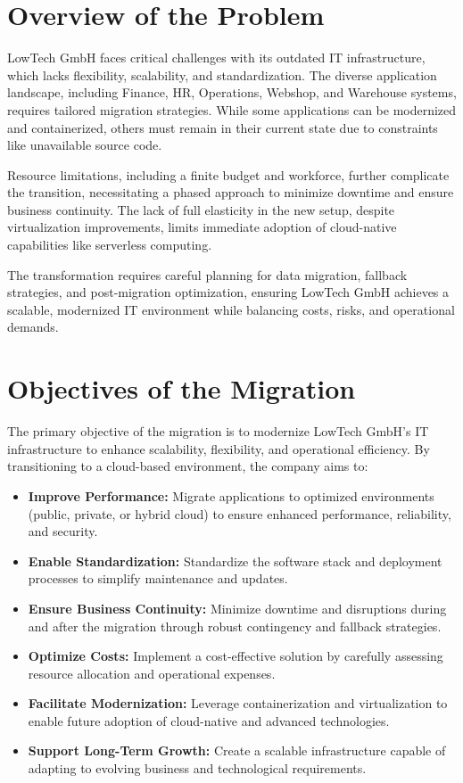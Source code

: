 \documentclass{llncs}
\begin{document}
\section{Overview of the Problem}
LowTech GmbH faces critical challenges with its outdated IT infrastructure, which lacks flexibility, scalability, and standardization. 
The diverse application landscape, including Finance, HR, Operations, Webshop, and Warehouse systems, 
requires tailored migration strategies. While some applications can be modernized and containerized, 
others must remain in their current state due to constraints like unavailable source code. 

Resource limitations, including a finite budget and workforce, further complicate the transition, necessitating 
a phased approach to minimize downtime and ensure business continuity. 
The lack of full elasticity in the new setup, despite virtualization improvements, limits immediate adoption 
of cloud-native capabilities like serverless computing. 

The transformation requires careful planning for data migration, fallback strategies, 
and post-migration optimization, ensuring LowTech GmbH achieves a scalable, 
modernized IT environment while balancing costs, risks, and operational demands.


\section{Objectives of the Migration}

The primary objective of the migration is to modernize LowTech GmbH's IT infrastructure to enhance scalability, flexibility, and operational efficiency. By transitioning to a cloud-based environment, the company aims to:

\begin{itemize}
    \item \textbf{Improve Performance:} Migrate applications to optimized environments (public, private, or hybrid cloud) to ensure enhanced performance, reliability, and security.
    \item \textbf{Enable Standardization:} Standardize the software stack and deployment processes to simplify maintenance and updates.
    \item \textbf{Ensure Business Continuity:} Minimize downtime and disruptions during and after the migration through robust contingency and fallback strategies.
    \item \textbf{Optimize Costs:} Implement a cost-effective solution by carefully assessing resource allocation and operational expenses.
    \item \textbf{Facilitate Modernization:} Leverage containerization and virtualization to enable future adoption of cloud-native and advanced technologies.
    \item \textbf{Support Long-Term Growth:} Create a scalable infrastructure capable of adapting to evolving business and technological requirements.
\end{itemize}
\end{document}
